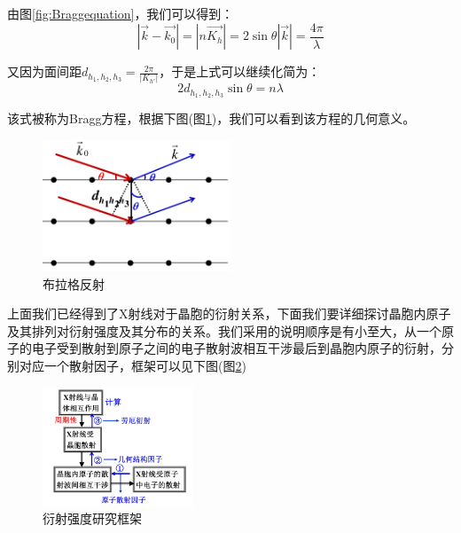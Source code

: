 \documentclass{ctexart}
\begin{document}
        由图\ref{fig:Braggequation}，我们可以得到：
        \begin{equation}
            |\vec{k}-\vec{k_0}|=|n\vec{K_h}|=2\sin{\theta}|\vec{k}|=\frac{4\pi}{\lambda}
        \end{equation}
        
        又因为面间距$d_{h_1,h_2,h_3}=\frac{2\pi}{|K_{h'}|}$，于是上式可以继续化简为：
        \begin{equation}
            2d_{h_1,h_2,h_3}\sin{\theta}=n\lambda
        \end{equation}
        
        该式被称为Bragg方程，根据下图(图\ref{fig:Braggreflection})，我们可以看到该方程的几何意义。
        
        \begin{figure}[H]
            \centering
            \includegraphics[width=0.5\textwidth]{figure/布拉格反射.png}
            \caption{布拉格反射}
            \label{fig:Braggreflection}
        \end{figure}
        
        上面我们已经得到了X射线对于晶胞的衍射关系，下面我们要详细探讨晶胞内原子及其排列对衍射强度及其分布的关系。我们采用的说明顺序是有小至大，从一个原子的电子受到散射到原子之间的电子散射波相互干涉最后到晶胞内原子的衍射，分别对应一个散射因子，框架可以见下图(图\ref{fig:diffractionintensity})
        \begin{figure}[H]
            \centering
            \includegraphics[width=0.4\textwidth]{figure/衍射强度.png}
            \caption{衍射强度研究框架}
            \label{fig:diffractionintensity}
        \end{figure}
        
\end{document}

